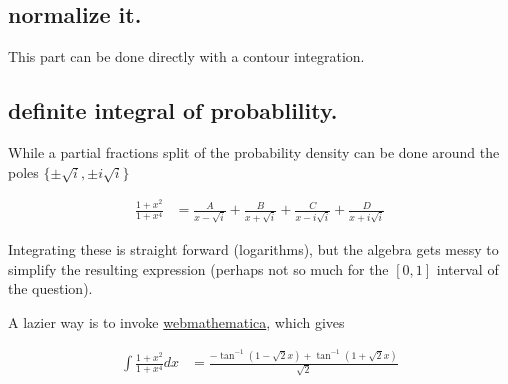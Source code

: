 \documentclass{article}
\begin{document}
\subsection{ normalize it. }

This part can be done directly with a contour integration.

\subsection{ definite integral of probablility. }

While a partial fractions split of the probability density can be done
around the poles $\{\pm\sqrt{i}, \pm i \sqrt{i}\}$

\begin{align*}
\frac{1 + x^2}{1 + x^4} &=
\frac{A}{x -\sqrt{i}}
+\frac{B}{x +\sqrt{i}}
+\frac{C}{x -i\sqrt{i}}
+\frac{D}{x +i\sqrt{i}}
\end{align*}

Integrating these is straight forward (logarithms), but
the algebra gets messy to simplify the resulting expression (perhaps not so
much for the $[0,1]$ interval of the question).

A lazier way is to invoke \href{http://integrals.wolfram.com/index.jsp}{webmathematica}, which gives

\begin{align*}
\int \frac{1 + x^2}{1 + x^4} dx &=
\frac{-\tan^{-1}(1 - \sqrt{2} x) + \tan^{-1}(1 + \sqrt{2} x)}{ \sqrt{2} }
\end{align*}



\end{document}
